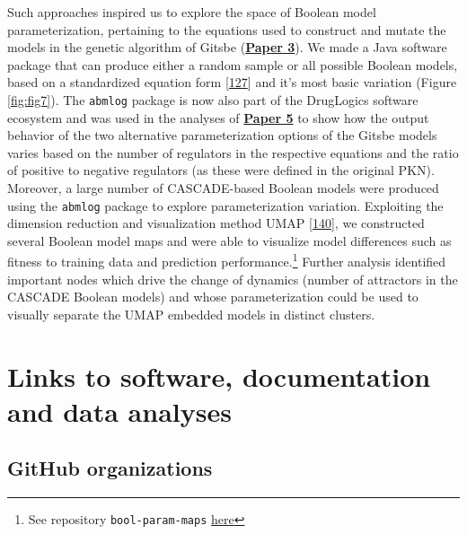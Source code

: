 \documentclass[
  12pt,
]{book}
\begin{document}
Such approaches inspired us to explore the space of Boolean model parameterization, pertaining to the equations used to construct and mutate the models in the genetic algorithm of Gitsbe (\textbf{\protect\hyperlink{Paper3}{Paper 3}}).
We made a Java software package that can produce either a random sample or all possible Boolean models, based on a standardized equation form {[}\protect\hyperlink{ref-Mendoza2006}{127}{]} and it's most basic variation (Figure \ref{fig:fig7}).
The \texttt{abmlog} package is now also part of the DrugLogics software ecosystem and was used in the analyses of \textbf{\protect\hyperlink{Paper5}{Paper 5}} to show how the output behavior of the two alternative parameterization options of the Gitsbe models varies based on the number of regulators in the respective equations and the ratio of positive to negative regulators (as these were defined in the original PKN).
Moreover, a large number of CASCADE-based Boolean models were produced using the \texttt{abmlog} package to explore parameterization variation.
Exploiting the dimension reduction and visualization method UMAP {[}\protect\hyperlink{ref-McInnes2018}{140}{]}, we constructed several Boolean model maps and were able to visualize model differences such as fitness to training data and prediction performance.\footnote{See repository \texttt{bool-param-maps} \protect\hyperlink{misc-links}{here}}
Further analysis identified important nodes which drive the change of dynamics (number of attractors in the CASCADE Boolean models) and whose parameterization could be used to visually separate the UMAP embedded models in distinct clusters.

\newpage

\hypertarget{appendix-appendix}{%
\appendix}


\hypertarget{links-to-software-documentation-and-data-analyses}{%
\chapter*{Links to software, documentation and data analyses}\label{links-to-software-documentation-and-data-analyses}}

\vspace{-10pt}

\hypertarget{github-org-links}{%
\section*{GitHub organizations}\label{github-org-links}}
\end{document}
